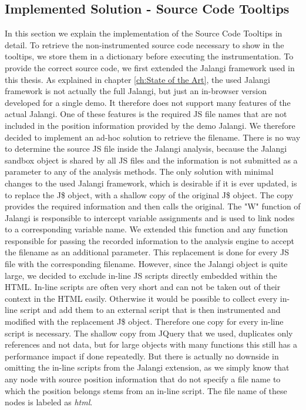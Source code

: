 \subsection{Implemented Solution - Source Code Tooltips}
In this section we explain the implementation of the Source Code Tooltips in detail. To retrieve the non-instrumented source code necessary to show in the tooltips, we store them in a dictionary before executing the instrumentation. To provide the correct source code, we first extended the Jalangi framework used in this thesis. As explained in chapter \ref{ch:State of the Art}, the used Jalangi framework is not actually the full Jalangi, but just an in-browser version developed for a single demo. It therefore does not support many features of the actual Jalangi. One of these features is the required JS file names that are not included in the position information provided by the demo Jalangi. We therefore decided to implement an ad-hoc solution to retrieve the filename. There is no way to determine the source JS file inside the Jalangi analysis, because the Jalangi sandbox object is shared by all JS files and the information is not submitted as a parameter to any of the analysis methods. The only solution with minimal changes to the used Jalangi framework, which is desirable if it is ever updated, is to replace the J\$ object, with a shallow copy of the original J\$ object. The copy provides the required information and then calls the original. The "W" function of Jalangi is responsible to intercept variable assignments and is used to link nodes to a corresponding variable name. We extended this function and any function responsible for passing the recorded information to the analysis engine to accept the filename as an additional parameter. This replacement is done for every JS file with the corresponding filename. However, since the Jalangi object is quite large, we decided to exclude in-line JS scripts directly embedded within the HTML. In-line scripts are often very short and can not be taken out of their context in the HTML easily. Otherwise it would be possible to collect every in-line script and add them to an external script that is then instrumented and modified with the replacement J\$ object. Therefore one copy for every in-line script is necessary. The shallow copy from JQuery that we used, duplicates only references and not data, but for large objects with many functions this still has a performance impact if done repeatedly. But there is actually no downside in omitting the in-line scripts from the Jalangi extension, as we simply know that any node with source position information that do not specify a file name to which the position belongs stems from an in-line script. The file name of these nodes is labeled as \emph{html}.\\
